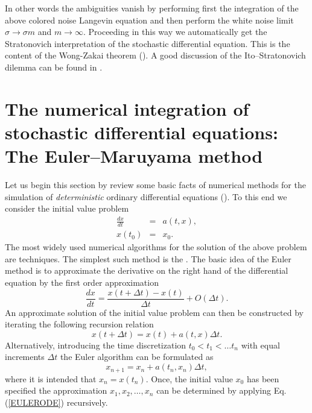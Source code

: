 In other words the ambiguities vanish by performing first the 
integration of the above colored noise Langevin equation and then 
perform the white noise limit $\sigma \rightarrow \sigma m$ and 
$m \rightarrow \infty$. Proceeding in this way we automatically 
get the Stratonovich interpretation of the stochastic differential 
equation. This is the content of the Wong-Zakai theorem 
(\cite{HORSTHEMKE}). A good discussion of the Ito--Stratonovich
dilemma can be found in \cite{VAN_KAMPEN}.



\section[The Euler--Maruyama Method]%
{The numerical integration of stochastic differential 
equations: The Euler--Maruyama method}
Let us begin this section by review some basic facts of numerical 
methods for the simulation of {\em deterministic} ordinary 
differential equations (\cite{GARCIA,PRESS}). 
To this end we consider the initial value 
problem
\begin{eqnarray*}
\frac{dx}{dt} &=& a(t,x), \\
   x(t_0) & = & x_0.
\end{eqnarray*}
The most widely used numerical algorithms for the solution of the 
above problem are  techniques. The simplest such 
method is the . The basic idea of the Euler 
method is to approximate the derivative on the right hand of the 
differential equation by the first order approximation
\begin{equation*}
\frac{dx}{dt} = \frac{x(t+\Delta t) - x(t)}{\Delta t} + O(\Delta 
t).
\end{equation*}
An approximate solution of the initial value problem can then be 
constructed by iterating the following recursion relation
\begin{equation*}
x(t+\Delta t) = x(t) + a(t,x)\Delta t.
\end{equation*}
Alternatively, introducing the time discretization
$t_0 < t_1 < \ldots t_n$ with equal increments $\Delta t$
the Euler algorithm can be formulated as
\begin{equation}
\label{EULERODE}
x_{n+1} = x_{n} + a(t_n,x_n) \Delta t,
\end{equation}
where it is intended that $x_n = x(t_n)$. Once, the initial value 
$x_0$ has been specified the approximation $x_1, x_2, \ldots, x_n$ 
can be determined by applying Eq. (\ref{EULERODE}) recursively.


